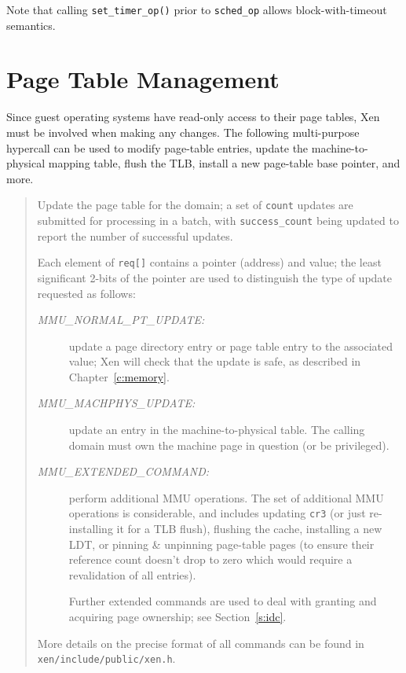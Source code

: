\documentclass[11pt,twoside,final,openright]{xenstyle}
\begin{document}
Note that calling {\tt set\_timer\_op()} prior to {\tt sched\_op} 
allows block-with-timeout semantics. 


\section{Page Table Management} 

Since guest operating systems have read-only access to their page 
tables, Xen must be involved when making any changes. The following
multi-purpose hypercall can be used to modify page-table entries, 
update the machine-to-physical mapping table, flush the TLB, install 
a new page-table base pointer, and more.

\begin{quote} 

Update the page table for the domain; a set of {\tt count} updates are
submitted for processing in a batch, with {\tt success\_count} being 
updated to report the number of successful updates.  

Each element of {\tt req[]} contains a pointer (address) and value; 
the least significant 2-bits of the pointer are used to distinguish 
the type of update requested as follows:
\begin{description} 

\item[\it MMU\_NORMAL\_PT\_UPDATE:] update a page directory entry or
page table entry to the associated value; Xen will check that the
update is safe, as described in Chapter~\ref{c:memory}.

\item[\it MMU\_MACHPHYS\_UPDATE:] update an entry in the
  machine-to-physical table. The calling domain must own the machine
  page in question (or be privileged).

\item[\it MMU\_EXTENDED\_COMMAND:] perform additional MMU operations.
The set of additional MMU operations is considerable, and includes
updating {\tt cr3} (or just re-installing it for a TLB flush),
flushing the cache, installing a new LDT, or pinning \& unpinning
page-table pages (to ensure their reference count doesn't drop to zero
which would require a revalidation of all entries).

Further extended commands are used to deal with granting and 
acquiring page ownership; see Section~\ref{s:idc}. 


\end{description}

More details on the precise format of all commands can be 
found in {\tt xen/include/public/xen.h}. 


\end{quote}
\end{document}
